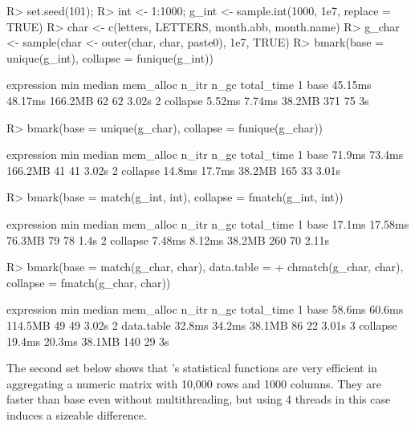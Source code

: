 \documentclass[article]{jss} %
\begin{document}
\begin{Schunk}
\begin{Sinput}
R> set.seed(101);
R> int <- 1:1000; g_int <- sample.int(1000, 1e7, replace = TRUE)
R> char <- c(letters, LETTERS, month.abb, month.name)
R> g_char <- sample(char <- outer(char, char, paste0), 1e7, TRUE)
R> bmark(base = unique(g_int), collapse = funique(g_int))
\end{Sinput}
\begin{Soutput}
  expression     min  median mem_alloc n_itr n_gc total_time
1       base 45.15ms 48.17ms   166.2MB    62   62      3.02s
2   collapse  5.52ms  7.74ms    38.2MB   371   75         3s
\end{Soutput}
\begin{Sinput}
R> bmark(base = unique(g_char), collapse = funique(g_char))
\end{Sinput}
\begin{Soutput}
  expression    min median mem_alloc n_itr n_gc total_time
1       base 71.9ms 73.4ms   166.2MB    41   41      3.02s
2   collapse 14.8ms 17.7ms    38.2MB   165   33      3.01s
\end{Soutput}
\begin{Sinput}
R> bmark(base = match(g_int, int), collapse = fmatch(g_int, int))
\end{Sinput}
\begin{Soutput}
  expression     min  median mem_alloc n_itr n_gc total_time
1       base  17.1ms 17.58ms    76.3MB    79   78       1.4s
2   collapse  7.48ms  8.12ms    38.2MB   260   70      2.11s
\end{Soutput}
\begin{Sinput}
R> bmark(base = match(g_char, char), data.table =
+        chmatch(g_char, char), collapse = fmatch(g_char, char))
\end{Sinput}
\begin{Soutput}
  expression    min median mem_alloc n_itr n_gc total_time
1       base 58.6ms 60.6ms   114.5MB    49   49      3.02s
2 data.table 32.8ms 34.2ms    38.1MB    86   22      3.01s
3   collapse 19.4ms 20.3ms    38.1MB   140   29         3s
\end{Soutput}
\end{Schunk}
%
The second set below shows that 's statistical functions are very efficient in aggregating a numeric matrix with 10,000 rows and 1000 columns. They are faster than base  even without multithreading, but using 4 threads in this case induces a sizeable difference.
\end{document}
